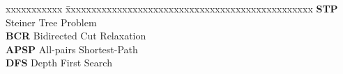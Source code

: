 \abbreviations
 
\noindent 
\begin{tabbing}
xxxxxxxxxxx \= xxxxxxxxxxxxxxxxxxxxxxxxxxxxxxxxxxxxxxxxxxxxxxxx \kill
\textbf{STP}   \> Steiner Tree Problem \\
\textbf{BCR}   \> Bidirected Cut Relaxation \\
\textbf{APSP}   \> All-pairs Shortest-Path\\
\textbf{DFS}   \> Depth First Search\\


\end{tabbing}

\pagebreak
